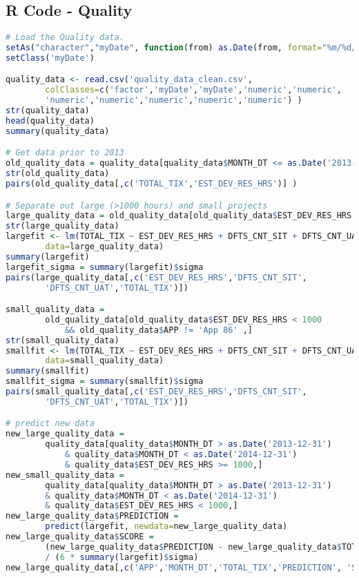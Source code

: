 \documentclass[SDSUThesis.tex]{subfiles}
\begin{document}
\subsection{R Code - Quality} 
\scriptsize{
\begin{lstlisting}[language=R]
# Load the Quality data.
setAs("character","myDate", function(from) as.Date(from, format="%m/%d/%Y") )
setClass('myDate')

quality_data <- read.csv('quality_data_clean.csv', 
        colClasses=c('factor','myDate','myDate','numeric','numeric',
        'numeric','numeric','numeric','numeric','numeric') )
str(quality_data)
head(quality_data)
summary(quality_data)

# Get data prior to 2013
old_quality_data = quality_data[quality_data$MONTH_DT <= as.Date('2013-12-31') ,]
str(old_quality_data)
pairs(old_quality_data[,c('TOTAL_TIX','EST_DEV_RES_HRS')] )

# Separate out large (>1000 hours) and small projects
large_quality_data = old_quality_data[old_quality_data$EST_DEV_RES_HRS >= 1000,]
str(large_quality_data)
largefit <- lm(TOTAL_TIX ~ EST_DEV_RES_HRS + DFTS_CNT_SIT + DFTS_CNT_UAT , 
        data=large_quality_data)
summary(largefit)
largefit_sigma = summary(largefit)$sigma
pairs(large_quality_data[,c('EST_DEV_RES_HRS','DFTS_CNT_SIT',
        'DFTS_CNT_UAT','TOTAL_TIX')])

small_quality_data = 
        old_quality_data[old_quality_data$EST_DEV_RES_HRS < 1000 
            && old_quality_data$APP != 'App 86' ,]
str(small_quality_data)
smallfit <- lm(TOTAL_TIX ~ EST_DEV_RES_HRS + DFTS_CNT_SIT + DFTS_CNT_UAT , 
        data=small_quality_data)
summary(smallfit)
smallfit_sigma = summary(smallfit)$sigma
pairs(small_quality_data[,c('EST_DEV_RES_HRS','DFTS_CNT_SIT',
        'DFTS_CNT_UAT','TOTAL_TIX')])

# predict new data  
new_large_quality_data = 
        quality_data[quality_data$MONTH_DT > as.Date('2013-12-31') 
            & quality_data$MONTH_DT < as.Date('2014-12-31') 
            & quality_data$EST_DEV_RES_HRS >= 1000,]
new_small_quality_data = 
        quality_data[quality_data$MONTH_DT > as.Date('2013-12-31') 
        & quality_data$MONTH_DT < as.Date('2014-12-31') 
        & quality_data$EST_DEV_RES_HRS < 1000,]
new_large_quality_data$PREDICTION = 
        predict(largefit, newdata=new_large_quality_data)
new_large_quality_data$SCORE = 
        (new_large_quality_data$PREDICTION - new_large_quality_data$TOTAL_TIX)
        / (6 * summary(largefit)$sigma)
new_large_quality_data[,c('APP','MONTH_DT','TOTAL_TIX','PREDICTION', 'SCORE')]


\end{lstlisting}}
\end{document}
